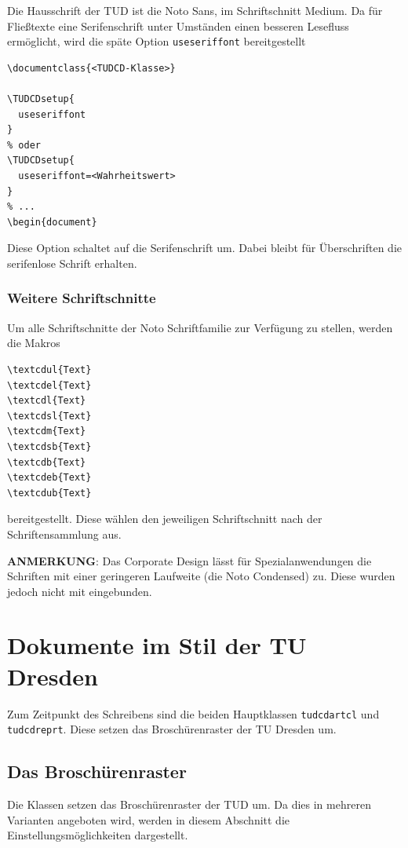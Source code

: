 \documentclass[
  logo={
    color=blue,
    language=de,
    colormodel=rgb
  },
  fontsize=11tudpt,
  usemargin,
  oneside
]{tudcdreprt}
\begin{document}
Die Hausschrift der TUD ist die Noto Sans, im Schriftschnitt Medium.
Da für Fließtexte eine Serifenschrift unter Umständen einen besseren
Lesefluss ermöglicht, wird die späte Option \texttt{useseriffont} bereitgestellt
\begin{lstlisting}
\documentclass{<TUDCD-Klasse>}

\TUDCDsetup{
  useseriffont
}
% oder
\TUDCDsetup{
  useseriffont=<Wahrheitswert>
}
% ...
\begin{document}
\end{lstlisting}
Diese Option schaltet auf die Serifenschrift um.
Dabei bleibt für Überschriften die serifenlose Schrift erhalten.

\subsection{Weitere Schriftschnitte}

Um alle Schriftschnitte der Noto Schriftfamilie zur Verfügung zu stellen,
werden die Makros
\begin{lstlisting}
\textcdul{Text}
\textcdel{Text}
\textcdl{Text}
\textcdsl{Text}
\textcdm{Text}
\textcdsb{Text}
\textcdb{Text}
\textcdeb{Text}
\textcdub{Text}
\end{lstlisting}
bereitgestellt. Diese wählen den jeweiligen Schriftschnitt nach der Schriftensammlung aus.

\textbf{ANMERKUNG}: Das Corporate Design lässt für Spezialanwendungen die Schriften mit
einer geringeren Laufweite (die Noto Condensed) zu. Diese wurden jedoch nicht mit eingebunden.



\chapter{Dokumente im Stil der TU Dresden}

Zum Zeitpunkt des Schreibens sind die beiden Hauptklassen
\texttt{tudcdartcl} und \texttt{tudcdreprt}.
Diese setzen das Broschürenraster der TU Dresden um.

\section{Das Broschürenraster}

Die Klassen setzen das Broschürenraster der TUD um.
Da dies in mehreren Varianten angeboten wird, werden in diesem Abschnitt
die Einstellungsmöglichkeiten dargestellt.
\end{document}
